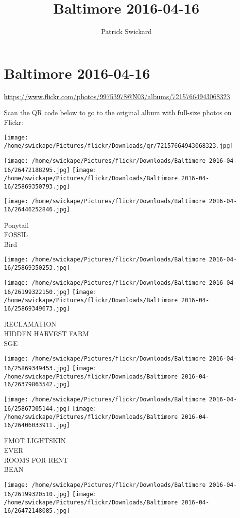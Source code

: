 \documentclass[10pt,letterpaper]{article}
\title{Baltimore 2016-04-16}
\author{Patrick Swickard}
\date{}
\begin{document}
\section*{Baltimore 2016-04-16}

\url{https://www.flickr.com/photos/99753978@N03/albums/72157664943068323}

Scan the QR code below to go to the original album with full-size photos on Flickr:

\texttt{[image: /home/swickape/Pictures/flickr/Downloads/qr/72157664943068323.jpg]}
\pagebreak

\texttt{[image: /home/swickape/Pictures/flickr/Downloads/Baltimore 2016-04-16/26472188295.jpg]}
\texttt{[image: /home/swickape/Pictures/flickr/Downloads/Baltimore 2016-04-16/25869350793.jpg]}

\texttt{[image: /home/swickape/Pictures/flickr/Downloads/Baltimore 2016-04-16/26446252846.jpg]}

Ponytail\\
FOSSIL\\
Bird
\pagebreak

\texttt{[image: /home/swickape/Pictures/flickr/Downloads/Baltimore 2016-04-16/25869350253.jpg]}

\vspace{0.25in}
\texttt{[image: /home/swickape/Pictures/flickr/Downloads/Baltimore 2016-04-16/26199322150.jpg]}
\texttt{[image: /home/swickape/Pictures/flickr/Downloads/Baltimore 2016-04-16/25869349673.jpg]}

RECLAMATION\\
HIDDEN HARVEST FARM\\
SGE
\pagebreak

\texttt{[image: /home/swickape/Pictures/flickr/Downloads/Baltimore 2016-04-16/25869349453.jpg]}
\texttt{[image: /home/swickape/Pictures/flickr/Downloads/Baltimore 2016-04-16/26379863542.jpg]}

\texttt{[image: /home/swickape/Pictures/flickr/Downloads/Baltimore 2016-04-16/25867305144.jpg]}
\texttt{[image: /home/swickape/Pictures/flickr/Downloads/Baltimore 2016-04-16/26406033911.jpg]}

FMOT LIGHTSKIN\\
EVER\\
ROOMS FOR RENT\\
BEAN
\pagebreak

\texttt{[image: /home/swickape/Pictures/flickr/Downloads/Baltimore 2016-04-16/26199320510.jpg]}
\texttt{[image: /home/swickape/Pictures/flickr/Downloads/Baltimore 2016-04-16/26472148085.jpg]}
\end{document}
